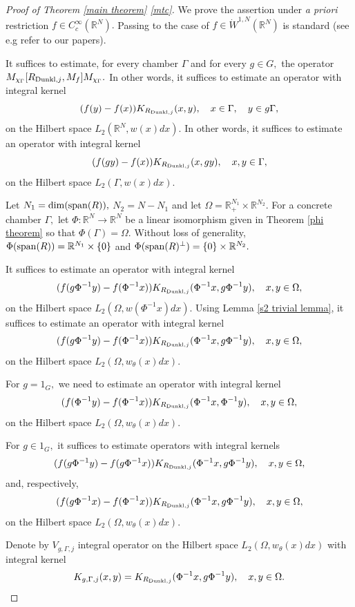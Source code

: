 \documentclass{amsart}
\begin{document}
\begin{proof}[Proof of Theorem \ref{main theorem} \eqref{mtc}] We prove the assertion under {\it a priori} restriction $f\in C^{\infty}_c(\mathbb{R}^N).$ Passing to the case of $f\in\dot{W}^{1,N}(\mathbb{R}^N)$ is standard (see e.g {\color{red} refer to our papers}).

It suffices to estimate, for every chamber $\Gamma$ and for every $g\in G,$ the operator $M_{\chi_{\Gamma}}[R_{{\rm Dunkl},j},M_f]M_{\chi_{\Gamma}}.$ In other words, it suffices to estimate an operator with integral kernel
$$(f(y)-f(x))K_{R_{{\rm Dunkl},j}}(x,y),\quad x\in\Gamma,\quad y\in g\Gamma,$$
on the Hilbert space $L_2(\mathbb{R}^N,w(x)dx).$ In other words, it suffices to estimate an operator with integral kernel
$$(f(gy)-f(x))K_{R_{{\rm Dunkl},j}}(x,gy),\quad x,y\in\Gamma,$$
on the Hilbert space $L_2(\Gamma,w(x)dx).$ 

Let $N_1={\rm dim}({\rm span}(R)),$ $N_2=N-N_1$ and let $\Omega=\mathbb{R}_+^{N_1}\times\mathbb{R}^{N_2}.$ For a concrete chamber $\Gamma,$ let $\Phi:\mathbb{R}^N\to\mathbb{R}^N$ be a linear isomorphism given in Theorem \ref{phi theorem} so that $\Phi(\Gamma)=\Omega.$ Without loss of generality, $\Phi({\rm span}(R))=\mathbb{R}^{N_1}\times\{0\}$ and $\Phi({\rm span}(R)^{\perp})=\{0\}\times\mathbb{R}^{N_2}.$

It suffices to estimate an operator with integral kernel
$$(f(g\Phi^{-1}y)-f(\Phi^{-1}x))K_{R_{{\rm Dunkl},j}}(\Phi^{-1}x,g\Phi^{-1}y),\quad x,y\in\Omega,$$
on the Hilbert space $L_2(\Omega,w(\Phi^{-1}x)dx).$ Using Lemma \ref{s2 trivial lemma}, it suffices to estimate an operator with integral kernel
$$(f(g\Phi^{-1}y)-f(\Phi^{-1}x))K_{R_{{\rm Dunkl},j}}(\Phi^{-1}x,g\Phi^{-1}y),\quad x,y\in\Omega,$$
on the Hilbert space $L_2(\Omega,w_{\theta}(x)dx).$

For $g=1_G,$ we need to estimate an operator with integral kernel
$$(f(\Phi^{-1}y)-f(\Phi^{-1}x))K_{R_{{\rm Dunkl},j}}(\Phi^{-1}x,\Phi^{-1}y),\quad x,y\in\Omega,$$
on the Hilbert space $L_2(\Omega,w_{\theta}(x)dx).$

For $g\in 1_G,$ it suffices to estimate operators with integral kernels
$$(f(g\Phi^{-1}y)-f(g\Phi^{-1}x))K_{R_{{\rm Dunkl},j}}(\Phi^{-1}x,g\Phi^{-1}y),\quad x,y\in\Omega,$$
and, respectively,
$$(f(g\Phi^{-1}x)-f(\Phi^{-1}x))K_{R_{{\rm Dunkl},j}}(\Phi^{-1}x,g\Phi^{-1}y),\quad x,y\in\Omega,$$
on the Hilbert space $L_2(\Omega,w_{\theta}(x)dx).$

Denote by $V_{g,\Gamma,j}$ integral operator on the Hilbert space $L_2(\Omega,w_{\theta}(x)dx)$ with integral kernel 
$$K_{g,\Gamma,j}(x,y)=K_{R_{{\rm Dunkl},j}}(\Phi^{-1}x,g\Phi^{-1}y),\quad x,y\in\Omega.$$


\end{proof}
\end{document}
